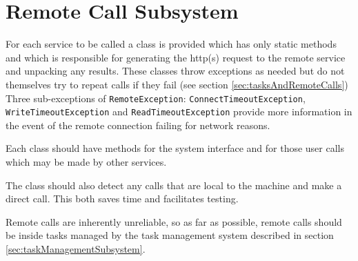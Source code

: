 \section{Remote Call Subsystem}
\label{sec:remoteCallSubsystem}

For each service to be called a class is provided which has only static
methods and which is responsible for generating the http(s) request to
the remote service and unpacking any results. These classes throw
exceptions as needed but do not themselves try to repeat calls if they
fail (see section \ref{sec:tasksAndRemoteCalls})  Three sub-exceptions
of \texttt{Remote\-Exception}: \texttt{ConnectTimeout\-Exception},
\texttt{WriteTimeout\-Exception} and \texttt{ReadTimeout\-Exception}
provide more information in the event of the remote connection failing
for network reasons. 

Each class should have methods for the system interface and for those
user calls which may be made by other services.

The class should also detect any calls that are local to the machine and make a
direct call. This both saves time and facilitates testing.

Remote calls are inherently unreliable, so as far as possible, remote
calls should be inside tasks managed by the task management system
described in section \ref{sec:taskManagementSubsystem}.





